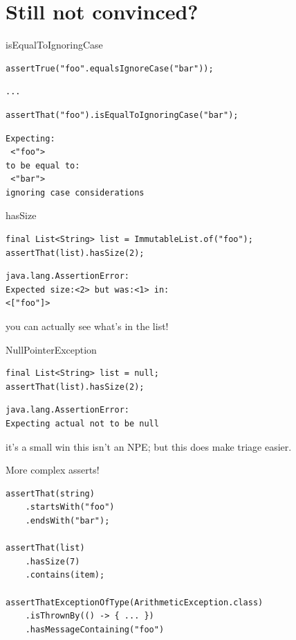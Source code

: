\documentclass[xetex,12pt,aspectratio=169]{beamer}
\begin{document}
\section{Still not convinced?}

\begin{frame}[fragile]{isEqualToIgnoringCase}
\begin{verbatim}
assertTrue("foo".equalsIgnoreCase("bar"));
\end{verbatim}
\begin{verbatim}
...
\end{verbatim}
\vfill
\begin{verbatim}
assertThat("foo").isEqualToIgnoringCase("bar");
\end{verbatim}
\begin{verbatim}
Expecting:
 <"foo">
to be equal to:
 <"bar">
ignoring case considerations
\end{verbatim}
\end{frame}

\begin{frame}[fragile]{hasSize}
\begin{verbatim}
final List<String> list = ImmutableList.of("foo");
assertThat(list).hasSize(2);
\end{verbatim}
\begin{verbatim}
java.lang.AssertionError:
Expected size:<2> but was:<1> in:
<["foo"]>
\end{verbatim}
\vfill
you can actually see what's in the list!
\end{frame}

\begin{frame}[fragile]{NullPointerException}
\begin{verbatim}
final List<String> list = null;
assertThat(list).hasSize(2);
\end{verbatim}
\begin{verbatim}
java.lang.AssertionError:
Expecting actual not to be null
\end{verbatim}
\vfill
it's a small win this isn't an NPE; but this does make triage easier.
\end{frame}

\begin{frame}[fragile]{More complex asserts!}
\begin{verbatim}
assertThat(string)
    .startsWith("foo")
    .endsWith("bar");

assertThat(list)
    .hasSize(7)
    .contains(item);

assertThatExceptionOfType(ArithmeticException.class)
    .isThrownBy(() -> { ... })
    .hasMessageContaining("foo")
\end{verbatim}
\end{frame}
\end{document}
